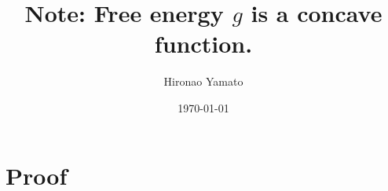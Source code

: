\documentclass[aps, 12pt]{revtex4-2}
\begin{document}
\title{Note: Free energy $g$ is a concave function.}
\author{Hironao Yamato}
\date{\today}
\maketitle

\section{Proof}


\end{document}
